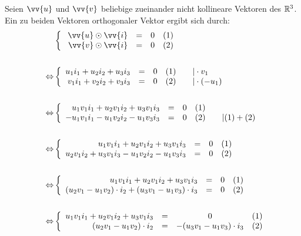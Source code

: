     \begin{Beweis}
        Seien $\vv{u}$ und $\vv{v}$ beliebige zueinander nicht kollineare Vektoren des $\mathbb{R}^3$. Ein zu beiden Vektoren orthogonaler Vektor ergibt sich durch: \\
        \begin{align*}
            \qquad &\left\{\begin{array}{rccl} \vv{u} \odot \vv{i} & = & 0 & (1) \\ \vv{v} \odot \vv{i} & = & 0 & (2)\end{array}\right. \\\\
            \Leftrightarrow &\left\{\begin{array}{rccl} u_1i_1 + u_2i_2 + u_3i_3 & = & 0 & (1) \qquad | \cdot v_1 \\ v_1i_1 + v_2i_2 + v_3i_3 & = & 0 & (2) \qquad | \cdot (-u_1) \end{array}\right. \\\\
            \Leftrightarrow &\left\{\begin{array}{rccl} u_1v_1i_1 + u_2v_1i_2 + u_3v_1i_3 & = & 0 & (1) \\ -u_1v_1i_1 - u_1v_2i_2 - u_1v_3i_3 & = & 0 & (2) \qquad | (1) + (2) \end{array}\right. \\\\
            \Leftrightarrow &\left\{\begin{array}{rccl} u_1v_1i_1 + u_2v_1i_2 + u_3v_1i_3 & = & 0 & (1) \\ u_2v_1i_2 + u_3v_1i_3 - u_1v_2i_2 - u_1v_3i_3 & = & 0 & (2) \end{array}\right. \\\\
            \Leftrightarrow &\left\{\begin{array}{rccl} u_1v_1i_1 + u_2v_1i_2 + u_3v_1i_3 & = & 0 & (1) \\ (u_2v_1 - u_1v_2) \cdot i_2 + (u_3v_1 - u_1v_3) \cdot i_3 & = & 0 & (2) \end{array}\right. \\\\
            \Leftrightarrow &\left\{\begin{array}{rccl} u_1v_1i_1 + u_2v_1i_2 + u_3v_1i_3 & = & 0 & (1) \\ (u_2v_1 - u_1v_2) \cdot i_2 & = & -(u_3v_1 - u_1v_3) \cdot i_3 & (2) \end{array}\right. \\\\

\end{align*}
\end{Beweis}
